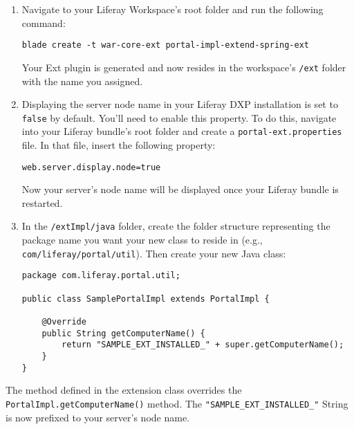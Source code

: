 \begin{enumerate}
\def\labelenumi{\arabic{enumi}.}
\item
  Navigate to your Liferay Workspace's root folder and run the following
  command:

\begin{verbatim}
blade create -t war-core-ext portal-impl-extend-spring-ext
\end{verbatim}

  Your Ext plugin is generated and now resides in the workspace's
  \texttt{/ext} folder with the name you assigned.
\item
  Displaying the server node name in your Liferay DXP installation is
  set to \texttt{false} by default. You'll need to enable this property.
  To do this, navigate into your Liferay bundle's root folder and create
  a \texttt{portal-ext.properties} file. In that file, insert the
  following property:

\begin{verbatim}
web.server.display.node=true
\end{verbatim}

  Now your server's node name will be displayed once your Liferay bundle
  is restarted.
\item
  In the \texttt{/extImpl/java} folder, create the folder structure
  representing the package name you want your new class to reside in
  (e.g., \texttt{com/liferay/portal/util}). Then create your new Java
  class:

\begin{verbatim}
package com.liferay.portal.util;

public class SamplePortalImpl extends PortalImpl {

    @Override
    public String getComputerName() {
        return "SAMPLE_EXT_INSTALLED_" + super.getComputerName();
    }
}
\end{verbatim}
\end{enumerate}

The method defined in the extension class overrides the
\texttt{PortalImpl.getComputerName()} method. The
\texttt{"SAMPLE\_EXT\_INSTALLED\_"} String is now prefixed to your
server's node name.

